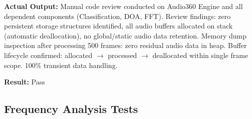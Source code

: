 \documentclass[12pt, titlepage]{article}
\begin{document}
\begin{enumerate}
\textbf{Actual Output:}
Manual code review conducted on Audio360 Engine and all dependent components
(Classification, DOA, FFT). Review findings: zero persistent storage structures
identified, all audio buffers allocated on stack (automatic deallocation), no
global/static audio data retention. Memory dump inspection after processing 500
frames: zero residual audio data in heap. Buffer lifecycle confirmed: allocated
$\rightarrow$ processed $\rightarrow$ deallocated within single frame scope.
100\% transient data handling.

\textbf{Result:} Pass

\end{enumerate}

\subsection{Frequency Analysis Tests}
\end{document}
